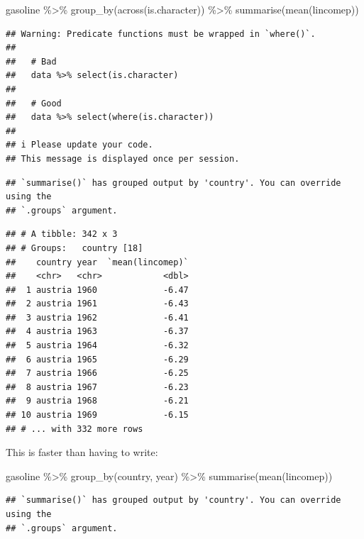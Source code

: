 \documentclass[
]{article}
\newenvironment{Shaded}{\begin{snugshade}}{\end{snugshade}}
\newcommand{\FunctionTok}[1]{\textcolor[rgb]{0.00,0.00,0.00}{#1}}
\newcommand{\NormalTok}[1]{#1}
\newcommand{\SpecialCharTok}[1]{\textcolor[rgb]{0.00,0.00,0.00}{#1}}
\begin{document}
\begin{Shaded}
\begin{Highlighting}[]
\NormalTok{gasoline }\SpecialCharTok{\%\textgreater{}\%}
  \FunctionTok{group\_by}\NormalTok{(}\FunctionTok{across}\NormalTok{(is.character)) }\SpecialCharTok{\%\textgreater{}\%}
  \FunctionTok{summarise}\NormalTok{(}\FunctionTok{mean}\NormalTok{(lincomep))}
\end{Highlighting}
\end{Shaded}

\begin{verbatim}
## Warning: Predicate functions must be wrapped in `where()`.
## 
##   # Bad
##   data %>% select(is.character)
## 
##   # Good
##   data %>% select(where(is.character))
## 
## i Please update your code.
## This message is displayed once per session.
\end{verbatim}

\begin{verbatim}
## `summarise()` has grouped output by 'country'. You can override using the
## `.groups` argument.
\end{verbatim}

\begin{verbatim}
## # A tibble: 342 x 3
## # Groups:   country [18]
##    country year  `mean(lincomep)`
##    <chr>   <chr>            <dbl>
##  1 austria 1960             -6.47
##  2 austria 1961             -6.43
##  3 austria 1962             -6.41
##  4 austria 1963             -6.37
##  5 austria 1964             -6.32
##  6 austria 1965             -6.29
##  7 austria 1966             -6.25
##  8 austria 1967             -6.23
##  9 austria 1968             -6.21
## 10 austria 1969             -6.15
## # ... with 332 more rows
\end{verbatim}

This is faster than having to write:

\begin{Shaded}
\begin{Highlighting}[]
\NormalTok{gasoline }\SpecialCharTok{\%\textgreater{}\%}
    \FunctionTok{group\_by}\NormalTok{(country, year) }\SpecialCharTok{\%\textgreater{}\%}
    \FunctionTok{summarise}\NormalTok{(}\FunctionTok{mean}\NormalTok{(lincomep))}
\end{Highlighting}
\end{Shaded}

\begin{verbatim}
## `summarise()` has grouped output by 'country'. You can override using the
## `.groups` argument.
\end{verbatim}
\end{document}

